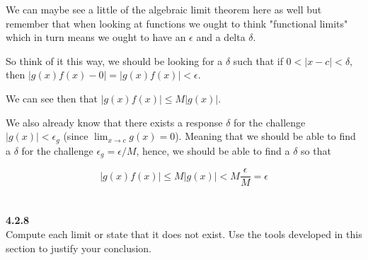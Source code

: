 We can maybe see a little of the algebraic limit theorem here as well but remember that when looking at functions
we ought to think "functional limits" which in turn means we ought to have an $\epsilon$ and a delta $\delta$.

So think of it this way, we should be looking for a $\delta$ such that if $0 < |x-c| < \delta$,
then $|g(x)f(x)-0| = |g(x)f(x)| < \epsilon$.

We can see then that $|g(x)f(x)| \leq M |g(x)|$.

We also already know that there exists a response $\delta$ for the challenge
$|g(x)| < \epsilon_{g}$ (since $\lim_{x\rightarrow c} g(x) = 0$).
Meaning that we should be able to find a $\delta$ for the challenge $\epsilon_g = \epsilon / M$,
hence, we should be able to find a $\delta$ so that

$$
|g(x)f(x)| \leq M |g(x)| < M \frac{\epsilon}{M} = \epsilon
$$
\\~\\



\textbf{4.2.8}
\\

Compute each limit or state that it does not exist.
Use the tools developed in this section to justify your conclusion.

